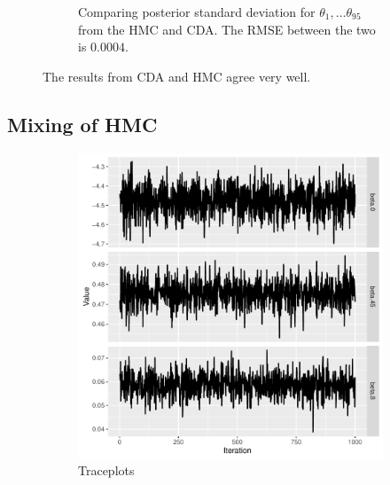 \documentclass[10pt]{article}
\begin{document}
\begin{figure}[H]
\begin{subfigure}[b]{0.45\textwidth}
 \caption{Comparing posterior standard deviation for $\theta_1,\dots \theta_{95}$ from the HMC and CDA.  The  RMSE between the two is $0.0004$.}
 \end{subfigure}  
 \caption{The results from CDA and HMC agree very well.}
 \end{figure}

\subsection{Mixing of HMC}


 \begin{figure}[H]
   \begin{subfigure}[b]{0.45\textwidth}
 \includegraphics[width=1\textwidth]{traceplot_poisson_hmc.pdf}
 \caption{Traceplots}
 \end{subfigure}
  \hfill 
 \begin{subfigure}[b]{0.45\textwidth}

\end{subfigure}
\end{figure}
\end{document}
